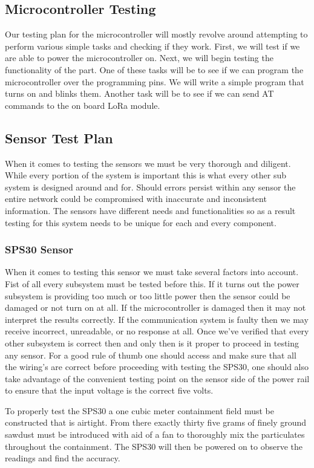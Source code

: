 \subsection{Microcontroller Testing}
Our testing plan for the microcontroller will mostly revolve around attempting to perform various simple tasks and checking if they work. First, we will test if we are able to power the microcontroller on. Next, we will begin testing the functionality of the part. One of these tasks will be to see if we can program the microcontroller over the programming pins. We will write a simple program that turns on and blinks them. Another task will be to see if we can send AT commands to the on board LoRa module.

\subsection{Sensor Test Plan}
When it comes to testing the sensors we must be very thorough and diligent. While every portion of the system is important this is what every other sub system is designed around and for. Should errors persist within any sensor the entire network could be compromised with inaccurate and inconsistent information. The sensors have different needs and functionalities so as a result testing for this system needs to be unique for each and every component.

\subsubsection{SPS30 Sensor}
When it comes to testing this sensor we must take several factors into account. Fist of all every subsystem must be tested before this. If it turns out the power subsystem is providing too much or too little power then the sensor could be damaged or not turn on at all. If the microcontroller is damaged then it may not interpret the results correctly. If the communication system is faulty then we may receive incorrect, unreadable, or no response at all. Once we've verified that every other subsystem is correct then and only then is it proper to proceed in testing any sensor.
For a good rule of thumb one should access and make sure that all the wiring's are correct before proceeding with testing the SPS30, one should also take advantage of the convenient testing point on the sensor side of the power rail to ensure that the input voltage is the correct five volts.

To properly test the SPS30 a one cubic meter containment field must be constructed that is airtight. From there exactly thirty five grams of finely ground sawdust must be introduced with aid of a fan to thoroughly mix the particulates throughout the containment. The SPS30 will then be powered on to observe the readings and find the accuracy.

